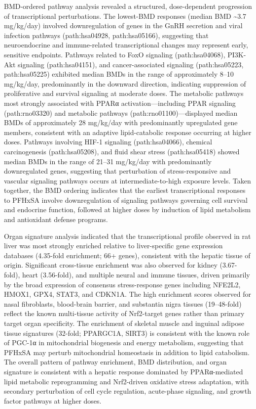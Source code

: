 BMD-ordered pathway analysis revealed a structured, dose-dependent progression of transcriptional perturbations. The lowest-BMD responses (median BMD \textasciitilde{}3.7 mg/kg/day) involved downregulation of genes in the GnRH secretion and viral infection pathways (path:hsa04928, path:hsa05166), suggesting that neuroendocrine and immune-related transcriptional changes may represent early, sensitive endpoints. Pathways related to FoxO signaling (path:hsa04068), PI3K-Akt signaling (path:hsa04151), and cancer-associated signaling (path:hsa05223, path:hsa05225) exhibited median BMDs in the range of approximately 8–10 mg/kg/day, predominantly in the downward direction, indicating suppression of proliferative and survival signaling at moderate doses. The metabolic pathways most strongly associated with PPARα activation—including PPAR signaling (path:rno03320) and metabolic pathways (path:rno01100)—displayed median BMDs of approximately 28 mg/kg/day with predominantly upregulated gene members, consistent with an adaptive lipid-catabolic response occurring at higher doses. Pathways involving HIF-1 signaling (path:hsa04066), chemical carcinogenesis (path:hsa05208), and fluid shear stress (path:hsa05418) showed median BMDs in the range of 21–31 mg/kg/day with predominantly downregulated genes, suggesting that perturbation of stress-responsive and vascular signaling pathways occurs at intermediate-to-high exposure levels. Taken together, the BMD ordering indicates that the earliest transcriptional responses to PFHxSA involve downregulation of signaling pathways governing cell survival and endocrine function, followed at higher doses by induction of lipid metabolism and antioxidant defense programs.

Organ signature analysis indicated that the transcriptional profile observed in rat liver was most strongly enriched relative to liver-specific gene expression databases (4.35-fold enrichment; 66+ genes), consistent with the hepatic tissue of origin. Significant cross-tissue enrichment was also observed for kidney (3.67-fold), heart (3.56-fold), and multiple neural and immune tissues, driven primarily by the broad expression of consensus stress-response genes including NFE2L2, HMOX1, GPX4, STAT3, and CDKN1A. The high enrichment scores observed for nasal fibroblasts, blood-brain barrier, and substantia nigra tissues (19–48-fold) reflect the known multi-tissue activity of Nrf2-target genes rather than primary target organ specificity. The enrichment of skeletal muscle and inguinal adipose tissue signatures (32-fold; PPARGC1A, SIRT3) is consistent with the known role of PGC-1α in mitochondrial biogenesis and energy metabolism, suggesting that PFHxSA may perturb mitochondrial homeostasis in addition to lipid catabolism. The overall pattern of pathway enrichment, BMD distribution, and organ signature is consistent with a hepatic response dominated by PPARα-mediated lipid metabolic reprogramming and Nrf2-driven oxidative stress adaptation, with secondary perturbation of cell cycle regulation, acute-phase signaling, and growth factor pathways at higher doses.

